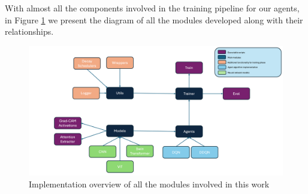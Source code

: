 With almost all the components involved in the training pipeline for our agents, in Figure \ref{fig:implementationoverview} we present the diagram of all the modules developed along with their relationships. 

\begin{figure}[!h]
	\centering
	\includegraphics[width=\linewidth]{figures/implementationoverview}
	\caption{Implementation overview of all the modules involved in this work}
	\label{fig:implementationoverview}
\end{figure}





